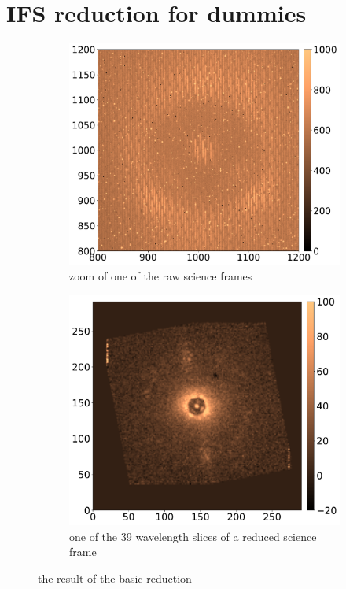 \documentclass[twoside,single,12pt]{lion-msc}
\begin{document}
\section{IFS reduction for dummies}
\begin{figure}[!b]
\centering
\begin{subfigure}{.48\textwidth}
  \centering
  \includegraphics[width=1\linewidth]{rawframe}
  \caption{zoom of one of the raw science frames}
  \label{fig:rawdata}
\end{subfigure}\hfill
\begin{subfigure}{.48\textwidth}
  \centering
  \includegraphics[width=1\linewidth]{reducedframe}
  \caption{one of the 39 wavelength slices of a reduced science frame}
  \label{fig:reduceddata}
\end{subfigure}
\caption{the result of the basic reduction}
\label{fig:datareduction}
\end{figure}
\end{document}

